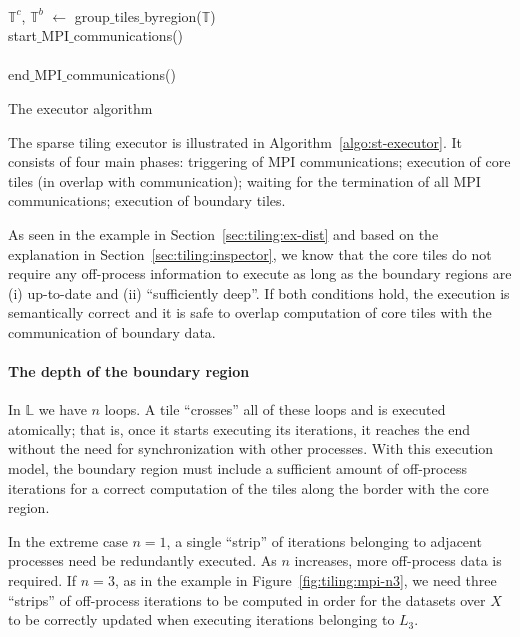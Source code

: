\begin{algorithm}[t]
\nonl ~\\
$\mathbb{T}^{c}$, $\mathbb{T}^{b}$ $\gets$ group$\_$tiles$\_$byregion($\mathbb{T}$)\;
\nonl ~\\
start$\_$MPI$\_$communications()\;
\nonl ~\\
\nonl ~\\
end$\_$MPI$\_$communications()\;
\nonl ~\\
\caption{The executor algorithm}
\label{algo:st-executor}
\end{algorithm}


The sparse tiling executor is illustrated in Algorithm~\ref{algo:st-executor}. It consists of four main phases: triggering of MPI communications; execution of core tiles (in overlap with communication); waiting for the termination of all MPI communications; execution of boundary tiles.

As seen in the example in Section~\ref{sec:tiling:ex-dist} and based on the explanation in Section~\ref{sec:tiling:inspector}, we know that the core tiles do not require any off-process information to execute as long as the boundary regions are (i) up-to-date and (ii) ``sufficiently deep''. If both conditions hold, the execution is semantically correct and it is safe to overlap computation of core tiles with the communication of boundary data. 


\paragraph{The depth of the boundary region}
In $\mathbb{L}$ we have $n$ loops. A tile ``crosses'' all of these loops and is executed atomically; that is, once it starts executing its iterations, it reaches the end without the need for synchronization with other processes. With this execution model, the boundary region must include a sufficient amount of off-process iterations for a correct computation of the tiles along the border with the core region. 

In the extreme case $n=1$, a single ``strip'' of iterations belonging to adjacent processes need be redundantly executed. As $n$ increases, more off-process data is required. If $n=3$, as in the example in Figure~\ref{fig:tiling:mpi-n3}, we need three ``strips'' of off-process iterations to be computed in order for the datasets over $X$ to be correctly updated when executing iterations belonging to $L_3$.

